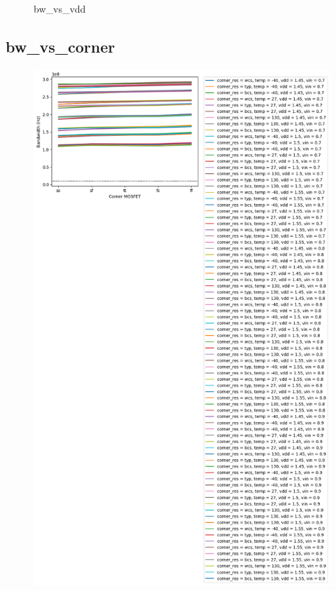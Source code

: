 \documentclass[
  a4paper,
  DIV=11,
  numbers=noendperiod]{scrartcl}
\begin{document}
\begin{tcolorbox}
\begin{figure}[H]
{}

\caption{bw\_vs\_vdd}

\end{figure}%

\subsection*{bw\_vs\_corner}\label{bw_vs_corner-1}

\begin{figure}[H]

{\centering \includegraphics{./cace/_docs/ota-improved/schematic/bw_vs_corner.png}

}
\end{figure}
\end{tcolorbox}
\end{document}
